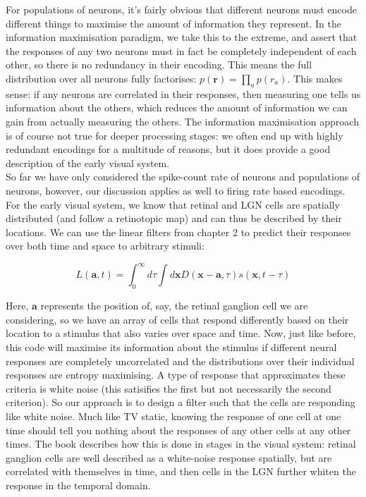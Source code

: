 \documentclass{article}
\begin{document}
For populations of neurons, it's fairly obvious that different neurons must encode different things to maximise the amount of information they represent. In the information maximisation paradigm, we take this to the extreme, and assert that the responses of any two neurons must in fact be completely independent of each other, so there is no redundancy in their encoding. This means the full distribution over all neurons fully factorises: $p(\bm{r})=\prod_ap(r_a)$. This makes sense: if any neurons are correlated in their responses, then measuring one tells us information about the others, which reduces the amount of information we can gain from actually measuring the others. The information maximisation approach is of course not true for deeper processing stages: we often end up with highly redundant encodings for a multitude of reasons, but it does provide a good description of the early visual system.\\

So far we have only considered the spike-count rate of neurons and populations of neurons, however, our discussion applies as well to firing rate based encodings. For the early visual system, we know that retinal and LGN cells are spatially distributed (and follow a retinotopic map) and can thus be described by their locations. We can use the linear filters from chapter 2 to predict their responses over both time and space to arbitrary stimuli:

\begin{equation*}
    L(\bm{a},t) = \int_0^{\infty} d\tau \int d\bm{x} D(\bm{x}-\bm{a},\tau) s(\bm{x},t-\tau)
\end{equation*}

Here, $\bm{a}$ represents the position of, say, the retinal ganglion cell we are considering, so we have an array of cells that respond differently based on their location to a stimulus that also varies over space and time. Now, just like before, this code will maximise its information about the stimulus if different neural responses are completely uncorrelated and the distributions over their individual responses are entropy maximising. A type of response that approximates these criteria is white noise (this satisifies the first but not necessarily the second criterion). So our approach is to design a filter such that the cells are responding like white noise. Much like TV static, knowing the response of one cell at one time should tell you nothing about the responses of any other cells at any other times. The book describes how this is done in stages in the visual system: retinal ganglion cells are well described as a white-noise response spatially, but are correlated with themselves in time, and then cells in the LGN further whiten the response in the temporal domain.\\
\end{document}
